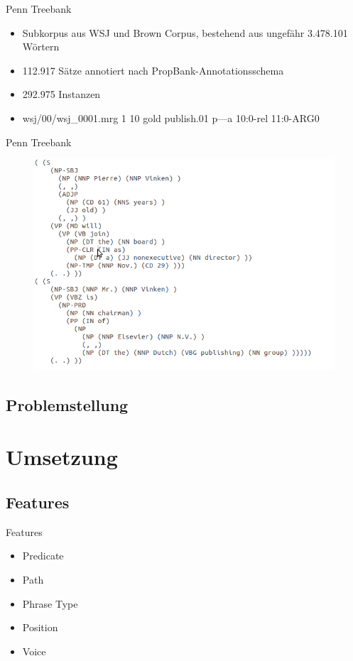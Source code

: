 \documentclass[10pt]{beamer}
\begin{document}
\begin{frame}{Penn Treebank}
  \begin{itemize}
   \item Subkorpus aus WSJ und Brown Corpus, bestehend aus ungefähr 3.478.101 Wörtern
   \item 112.917 Sätze annotiert nach PropBank-Annotationsschema
   \item 292.975 Instanzen
   \item \small wsj/00/wsj_0001.mrg 1 10 gold publish.01 p---a 10:0-rel 11:0-ARG0
          
  \end{itemize}

\end{frame}

\begin{frame}{Penn Treebank}
   \begin{figure}[h]
      \centering \includegraphics[scale=0.3]{ptb_example}
   \end{figure}
\end{frame}

\subsection{Problemstellung}

\section{Umsetzung}
\subsection{Features}
  \begin{frame}{Features}
    \begin{itemize}
     \item Predicate
     \item Path
     \item Phrase Type
     \item Position
     \item Voice
    \end{itemize}
    
   \end{frame}
   
\end{document}
